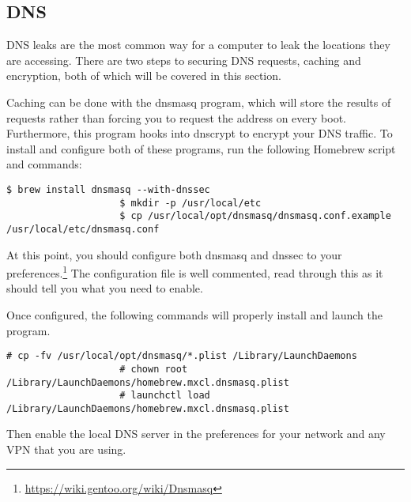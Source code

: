 			\subsection{DNS}
				DNS leaks are the most common way for a computer to leak the locations they are accessing.
				There are two steps to securing DNS requests, caching and encryption, both of which will be covered in this section.

				Caching can be done with the dnsmasq program, which will store the results of requests rather than forcing you to request the address on every boot.
				Furthermore, this program hooks into dnscrypt to encrypt your DNS traffic.
				To install and configure both of these programs, run the following Homebrew script and commands:
				\begin{lstlisting}[style=CLI]
					$ brew install dnsmasq --with-dnssec
					$ mkdir -p /usr/local/etc
					$ cp /usr/local/opt/dnsmasq/dnsmasq.conf.example /usr/local/etc/dnsmasq.conf
				\end{lstlisting} %
				At this point, you should configure both dnsmasq and dnssec to your preferences.\footnote{\url{https://wiki.gentoo.org/wiki/Dnsmasq}}
				The configuration file is well commented, read through this as it should tell you what you need to enable.

				Once configured, the following commands will properly install and launch the program.
				\begin{lstlisting}[style=CLI]
					# cp -fv /usr/local/opt/dnsmasq/*.plist /Library/LaunchDaemons
					# chown root /Library/LaunchDaemons/homebrew.mxcl.dnsmasq.plist
					# launchctl load /Library/LaunchDaemons/homebrew.mxcl.dnsmasq.plist
				\end{lstlisting}
				Then enable the local DNS server in the preferences for your network and any VPN that you are using.

